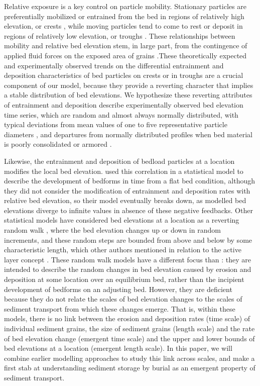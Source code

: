 \documentclass{article}
\begin{document}
Relative exposure is a key control on particle mobility. Stationary particles are preferentially mobilized or entrained from the bed in regions of relatively high elevation, or crests \citep{Sayre1965, Sayre1967, Yang1971, Sawai1987, Wong2007}, while moving particles tend to come to rest or deposit in regions of relatively low elevation, or troughs \citep{Sayre1965, Yang1971, Charru2004, Wong2007}. These relationships between mobility and relative bed elevation stem, in large part, from the contingence of applied fluid forces on the exposed area of grains \citep{Hofland2005, Dwivedi2012}.These theoretically expected and experimentally observed trends on the differential entrainment and deposition characteristics of bed particles on crests or in troughs are a crucial component of our model, because they provide a reverting character that implies a stable distribution of bed elevations. We hypothesize these reverting attributes of entrainment and deposition describe experimentally observed bed elevation time series, which are random and almost always normally distributed, with typical deviations from mean values of one to five representative particle diameters \citep{Crickmore1962, Yang1971, Wong2007, Singh2009, Voepel2013}, and departures from normally distributed profiles when bed material is poorly consolidated or armored \citep{Singh2009}.   
 
Likewise, the entrainment and deposition of bedload particles at a location modifies the local bed elevation. \citet{Nakagawa1980} used this correlation in a statistical model to describe the development of bedforms in time from a flat bed condition, although they did not consider the modification of entrainment and deposition rates with relative bed elevation, so their model eventually breaks down, as modelled bed elevations diverge to infinite values in absence of these negative feedbacks. Other statistical models have considered bed elevations at a location as a reverting random walk \citep{Voepel2013, Martin2014}, where the bed elevation changes up or down in random increments, and these random steps are bounded from above and below by some characteristic length, which other authors mentioned in relation to the active layer concept \citep{Wong2007, Church2017}. These random walk models have a different focus than \citet{Nakagawa1980}: they are intended to describe the random changes in bed elevation caused by erosion and deposition at some location over an equilibrium bed, rather than the incipient development of bedforms on an adjusting bed. However, they are deficient because they do not relate the scales of bed elevation changes to the scales of sediment transport from which these changes emerge. That is, within these models, there is no link between the erosion and deposition rates (time scale) of individual sediment grains, the size of sediment grains (length scale) and the rate of bed elevation change (emergent time scale) and the upper and lower bounds of bed elevations at a location (emergent length scale). In this paper, we will combine earlier modelling approaches to study this link across scales, and make a first stab at understanding sediment storage by burial as an emergent property of sediment transport. 
\end{document}
